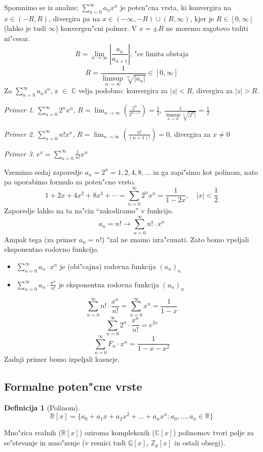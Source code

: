 \documentclass[a4paper,12pt]{article}
\theoremstyle{definition}
\newtheorem{defn}[counter]{Definicija}
\theoremstyle{remark}
\newtheorem*{ex}{Primer}
\newcommand{\Z}{\mathbb{Z}}
\newcommand{\Q}{\mathbb{Q}}
\newcommand{\R}{\mathbb{R}}
\newcommand{\C}{\mathbb{C}}
\begin{document}
\begin{enumerate}
    Spomnimo se iz analize: $\sum_{n = 0}^{\infty} a_n x^n$ je poten"cna vrsta, ki konvergira na $x \in (-R, R)$, divergira pa na $x \in (-\infty, -R) \cup (R, \infty)$, kjer je $R \in [0, \infty]$ (lahko je tudi $\infty$) konvergen"cni polmer. V $x = \pm R$ ne moremo zagotovo trditi ni"cesar.
    \[R = \lim_{n \to \infty} |\frac{a_n}{a_{n + 1}}| \text{, "ce limita obstaja}\]
    \[R = \frac{1}{\limsup\limits_{n \to \infty} \sqrt[n]{|a_n|}} \in [0, \infty]\]
    Za $\sum_{n = 0}^{\infty} a_n z^n$, z $\in$ $\C$ velja podobno: konvergira za $|z| < R$, divergira za $|z| > R$.
    \begin{ex}
    	$\sum_{n = 0}^{\infty} 2^n x^n$, $R = \lim_{n \to \infty} (\frac{2^n}{2^{n + 1}}) = \frac{1}{2}$, $\frac{1}{\limsup\limits_{n \to \infty} \sqrt[n]{|2^n|}} = \frac{1}{2}$
    \end{ex}
    \begin{ex}
    	$\sum_{n = 0}^{\infty} n! x^n$, $R = \lim_{n \to \infty} (\frac{n!}{(n + 1)!}) = 0$, divergira za $x \neq 0$
    \end{ex}
    \begin{ex}
    	$e^x = \sum_{n = 0}^{\infty} \frac{1}{n!} x^n$
    \end{ex}

    Vzemimo sedaj zaporedje $a_n = 2^n = 1, 2, 4, 8, \ldots$ in ga zapi"simo kot polinom, nato pa uporabimo formulo za poten"cno vrsto.
    \[1 + 2x + 4x^2 + 8x^3 + \cdots = \sum_{n=0}^{\infty} 2^n x^n = \frac{1}{1 - 2x}, \quad |x| < \frac{1}{2}\]
    Zaporedje lahko na ta na"cin ``zakodiramo'' v funkcijo.
    \[a_n = n! \rightarrow \sum_{n = 0}^{\infty} n! \cdot x^n\]
    Ampak tega (za primer $a_n = n!$) "zal ne znamo izra"cunati. Zato bomo vpeljali eksponentno rodovno funkcijo.
    
    \begin{itemize}
        \item $\sum_{n = 0}^{\infty} a_n \cdot x^n$ je (obi"cajna) rodovna funkcija $(a_n)_n$
        \item $\sum_{n = 0}^{\infty} a_n \cdot \frac{x^n}{n!}$ je eksponentna rodovna funkcija $(a_n)_n$
    \end{itemize}
    \[\sum_{n = 0}^{\infty} n! \cdot \frac{x^n}{n!} = \sum_{n = 0}^{\infty} x^n = \frac{1}{1 - x}\]
    \[\sum_{n = 0}^{\infty} 2^n \cdot \frac{x^n}{n!} = e^{2x}\]
    \[\sum_{n = 0}^{\infty} F_n \cdot x^n = \frac{1}{1-x-x^2}\]
    Zadnji primer bomo izpeljali kasneje.
\end{enumerate}

\subsection{Formalne poten"cne vrste}
\begin{defn}[Polinom]
	\[\R [x] = \{a_0 + a_1 x + a_2 x^2 + ... + a_n x^n: a_0, ..., a_n \in \R\}\]
\end{defn}
Mno"zica realnih ($\R[x]$) oziroma kompleksnih ($\C[x]$) polinomov tvori polje za se"stevanje in mno"zenje (v resnici tudi $\Q[x]$, $\Z_p[x]$ in ostali obsegi).
\end{document}
